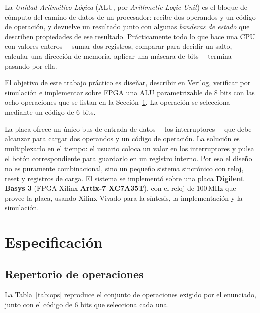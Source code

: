 \documentclass[12pt,a4paper]{article}
\begin{document}
La \emph{Unidad Aritmético-Lógica} (ALU, por \textit{Arithmetic Logic Unit}) es el bloque
de cómputo del camino de datos de un procesador: recibe dos operandos y un código de
operación, y devuelve un resultado junto con algunas \emph{banderas de estado} que
describen propiedades de ese resultado. Prácticamente todo lo que hace una CPU con valores
enteros ---sumar dos registros, comparar para decidir un salto, calcular una dirección de
memoria, aplicar una máscara de bits--- termina pasando por ella.

El objetivo de este trabajo práctico es diseñar, describir en Verilog, verificar por
simulación e implementar sobre FPGA una ALU parametrizable de 8 bits con las ocho
operaciones que se listan en la Sección~\ref{sec:spec}. La operación se selecciona
mediante un código de 6 bits.

La placa ofrece un único bus de entrada de datos ---los interruptores--- que debe alcanzar
para cargar dos operandos y un código de operación. La solución es multiplexarlo en el
tiempo: el usuario coloca un valor en los interruptores y pulsa el botón correspondiente
para guardarlo en un registro interno. Por eso el diseño no es puramente combinacional,
sino un pequeño sistema sincrónico con reloj, reset y registros de carga. El sistema se
implementó sobre una placa \textbf{Digilent Basys 3} (FPGA Xilinx \textbf{Artix-7
XC7A35T}), con el reloj de 100\,MHz que provee la placa, usando Xilinx Vivado para la
síntesis, la implementación y la simulación.

\section{Especificación}
\label{sec:spec}

\subsection{Repertorio de operaciones}

La Tabla~\ref{tab:ops} reproduce el conjunto de operaciones exigido por el enunciado, junto con el código de 6 bits que selecciona cada una.
\end{document}
